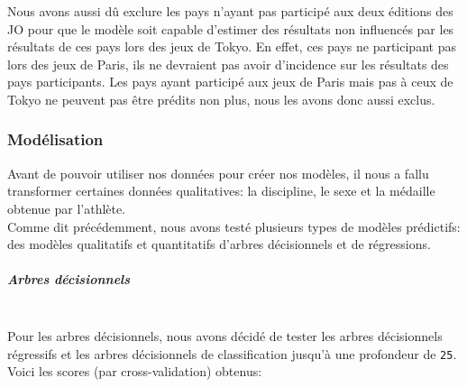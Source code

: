 \documentclass{article}
\begin{document}
Nous avons aussi dû exclure les pays n'ayant pas participé aux deux éditions des JO pour que le modèle soit capable d'estimer des résultats non influencés par les résultats de ces pays lors des jeux de Tokyo. En effet, ces pays ne participant pas lors des jeux de Paris, ils ne devraient pas avoir d'incidence sur les résultats des pays participants. Les pays ayant participé aux jeux de Paris mais pas à ceux de Tokyo ne peuvent pas être prédits non plus, nous les avons donc aussi exclus.

\subsubsection{Modélisation}

Avant de pouvoir utiliser nos données pour créer nos modèles, il nous a fallu transformer certaines données qualitatives: la discipline, le sexe et la médaille obtenue par l'athlète.
\\

Comme dit précédemment, nous avons testé plusieurs types de modèles prédictifs: des modèles qualitatifs et quantitatifs d'arbres décisionnels et de régressions.

\subparagraph{Arbres décisionnels}
\ \\

Pour les arbres décisionnels, nous avons décidé de tester les arbres décisionnels régressifs et les arbres décisionnels de classification jusqu'à une profondeur de \verb|25|. Voici les scores (par cross-validation) obtenus:
\end{document}
